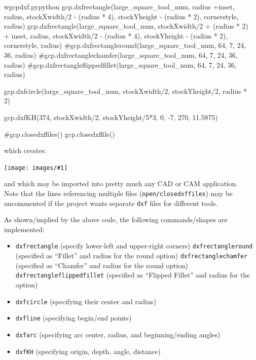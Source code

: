 \documentclass{ltxdoc}
\newcommand{\includeimage}[1]{\bigskip\noindent\texttt{[image: images/\#1]}\bigskip}
\begin{document}
\begin{writecode}{w}{gcpdxf.py}{python}
gcp.dxfrectangle(large_square_tool_num, radius +inset, radius, stockXwidth/2 - (radius * 4), stockYheight - (radius * 2), cornerstyle, radius) 
gcp.dxfrectangle(large_square_tool_num, stockXwidth/2 + (radius * 2) + inset, radius, stockXwidth/2 - (radius * 4), stockYheight - (radius * 2), cornerstyle, radius) 
#gcp.dxfrectangleround(large_square_tool_num, 64, 7, 24, 36, radius)
#gcp.dxfrectanglechamfer(large_square_tool_num, 64, 7, 24, 36, radius)
#gcp.dxfrectangleflippedfillet(large_square_tool_num, 64, 7, 24, 36, radius)

gcp.dxfcircle(large_square_tool_num, stockXwidth/2, stockYheight/2, radius * 2)

gcp.dxfKH(374, stockXwidth/2, stockYheight/5*3, 0, -7, 270, 11.5875)

#gcp.closedxffiles()
gcp.closedxffile()

\end{writecode}
\addtocounter{gcpdxfpy}{40}

\noindent which creates:

\bigskip

\includeimage{gcpdxf.pdf}

\bigskip

\noindent and which may be imported into pretty much any CAD or CAM application. Note that the lines referencing multiple files (\verb|open/closedxffiles|) may be uncommented if the project wants separate \verb|dxf| files for different tools.

As shown/implied by the above code, the following commands/shapes are implemented:

\begin{itemize}
\item \verb|dxfrectangle| (specify lower-left and upper-right corners)
\subitem\verb|dxfrectangleround| (specified as ``Fillet'' and radius for the round option)
\subitem\verb|dxfrectanglechamfer| (specified as ``Chamfer'' and radius for the round option)
\subitem\verb|dxfrectangleflippedfillet| (specified as ``Flipped Fillet'' and radius for the option)
\item \verb|dxfcircle| (specifying their center and radius)
\item \verb|dxfline| (specifying begin/end points)
\item \verb|dxfarc| (specifying arc center, radius, and beginning/ending angles)
\item \verb|dxfKH| (specifying origin, depth, angle, distance)
 \end{itemize}
\end{document}
